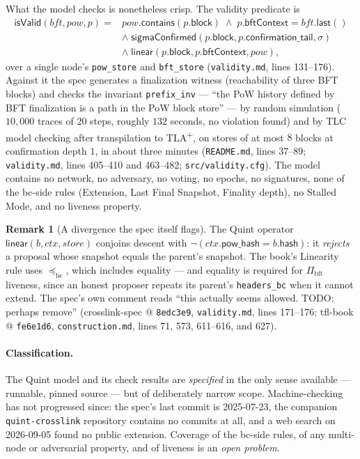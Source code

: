 \documentclass[11pt,a4paper]{article}
\theoremstyle{definition}
\newtheorem{remark}[theorem]{Remark}
\begin{document}
What the model checks is nonetheless crisp. The validity predicate is
\[
\begin{aligned}
\mathsf{isValid}(\mathit{bft},\mathit{pow},p) = {}&
  \mathit{pow}.\mathsf{contains}(p.\mathsf{block})
  \;\wedge\; p.\mathsf{bftContext} = \mathit{bft}.\mathsf{last}()\\
&\wedge\; \mathsf{sigmaConfirmed}(p.\mathsf{block},
    p.\mathsf{confirmation\_tail}, \sigma)\\
&\wedge\; \mathsf{linear}(p.\mathsf{block}, p.\mathsf{bftContext},
    \mathit{pow}),
\end{aligned}
\]
over a single node's \texttt{pow\_store} and \texttt{bft\_store}
(\texttt{validity.md}, lines 131--176). Against it the spec generates a
finalization witness (reachability of three BFT blocks) and checks the
invariant \texttt{prefix\_inv} --- ``the PoW history defined by BFT
finalization is a path in the PoW block store'' --- by random simulation
($10{,}000$ traces of $20$ steps, roughly $132$ seconds, no violation
found) and by TLC model checking after transpilation to TLA\textsuperscript{+},
on stores of at most $8$ blocks at confirmation depth $1$, in about three
minutes (\texttt{README.md}, lines 37--89; \texttt{validity.md}, lines
405--410 and 463--482; \texttt{src/validity.cfg}). The model contains no
network, no adversary, no voting, no epochs, no signatures, none of the
bc-side rules (Extension, Last Final Snapshot, Finality depth), no Stalled
Mode, and no liveness property.

\begin{remark}[A divergence the spec itself flags]\label{rem:xl-quint-div}
The Quint operator $\mathsf{linear}(b, \mathit{ctx}, \mathit{store})$
conjoins descent with
$\neg(\mathit{ctx}.\mathsf{pow\_hash} = b.\mathsf{hash})$: it
\emph{rejects} a proposal whose snapshot equals the parent's snapshot. The
book's Linearity rule uses $\preceq_{\mathrm{bc}}$, which includes
equality --- and equality is required for $\Pi_{\mathrm{bft}}$ liveness,
since an honest proposer repeats its parent's \texttt{headers\_bc} when it
cannot extend. The spec's own comment reads ``this actually seems allowed.
TODO: perhaps remove'' (crosslink-spec @ \texttt{8edc3e9},
\texttt{validity.md}, lines 171--176; tfl-book @ \texttt{fe6e1d6},
\texttt{construction.md}, lines 71, 573, 611--616, and 627).
\end{remark}

\paragraph{Classification.} The Quint model and its check results are
\emph{specified} in the only sense available --- runnable, pinned source
--- but of deliberately narrow scope. Machine-checking has not progressed
since: the spec's last commit is 2025-07-23, the companion
\texttt{quint-crosslink} repository contains no commits at all, and a web
search on 2026-09-05 found no public extension.
Coverage of the bc-side rules, of any multi-node or adversarial property,
and of liveness is an \emph{open problem}.
\end{document}
